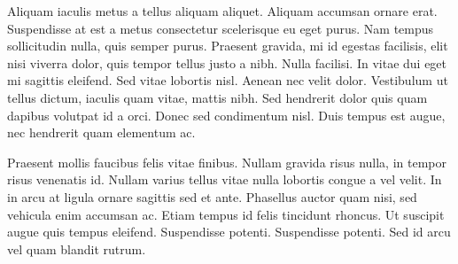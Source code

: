 \documentclass[10pt,openany]{book}
\begin{document}
Aliquam iaculis metus a tellus aliquam aliquet. Aliquam accumsan ornare erat.
Suspendisse at est a metus consectetur scelerisque eu eget purus. Nam tempus
sollicitudin nulla, quis semper purus. Praesent gravida, mi id egestas
facilisis, elit nisi viverra dolor, quis tempor tellus justo a nibh. Nulla
facilisi. In vitae dui eget mi sagittis eleifend. Sed vitae lobortis nisl.
Aenean nec velit dolor. Vestibulum ut tellus dictum, iaculis quam vitae, mattis
nibh. Sed hendrerit dolor quis quam dapibus volutpat id a orci. Donec sed
condimentum nisl. Duis tempus est augue, nec hendrerit quam elementum ac.

Praesent mollis faucibus felis vitae finibus. Nullam gravida risus nulla, in
tempor risus venenatis id. Nullam varius tellus vitae nulla lobortis congue a
vel velit. In in arcu at ligula ornare sagittis sed et ante. Phasellus auctor
quam nisi, sed vehicula enim accumsan ac. Etiam tempus id felis tincidunt
rhoncus. Ut suscipit augue quis tempus eleifend. Suspendisse potenti.
Suspendisse potenti. Sed id arcu vel quam blandit rutrum. 

\vfill

\theendnotes

\myendpage
\end{document}

